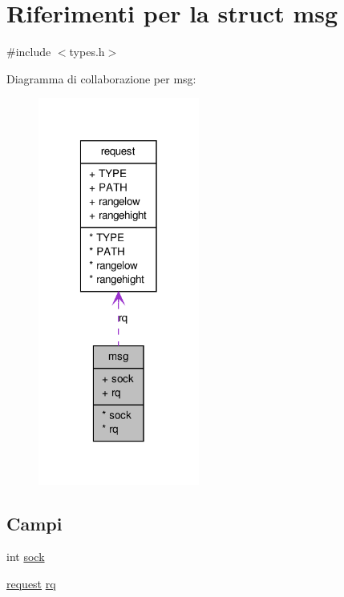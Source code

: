 \hypertarget{structmsg}{
\section{Riferimenti per la struct msg}
\label{structmsg}
}


{\ttfamily \#include $<$types.h$>$}



Diagramma di collaborazione per msg:
\nopagebreak
\begin{figure}[H]
\begin{center}
\leavevmode
\includegraphics[width=150pt]{structmsg__coll__graph}
\end{center}
\end{figure}
\subsection*{Campi}
{\bf }\par
\begin{DoxyCompactItemize}
\item 
int \hyperlink{structmsg_a6c8d25eefec0d18f66eabc7bf9fc272f}{sock}
\item 
\hyperlink{structrequest}{request} \hyperlink{structmsg_a352d360ff9728d5158f3124f989c1652}{rq}
\end{DoxyCompactItemize}



